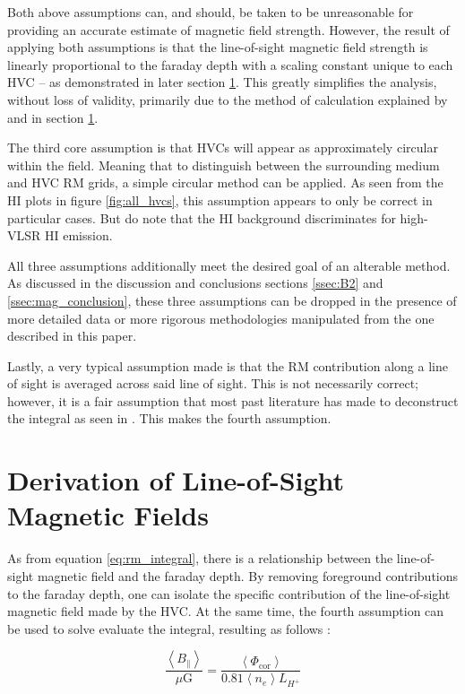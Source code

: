 Both above assumptions can, and should, be taken to be unreasonable for providing an accurate estimate of magnetic field strength. However, the result of applying both assumptions is that the line-of-sight magnetic field strength is linearly proportional to the faraday depth with a scaling constant unique to each HVC – as demonstrated in later section \ref{sec:los_dev}. This greatly simplifies the analysis, without loss of validity, primarily due to the method of calculation explained by \cite{ID27} and in section \ref{sec:los_dev}.


The third core assumption is that HVCs will appear as approximately circular within the field. Meaning that to distinguish between the surrounding medium and HVC RM grids, a simple circular method can be applied. As seen from the HI plots in figure \ref{fig:all_hvcs}, this assumption appears to only be correct in particular cases. But do note that the HI background discriminates for high-VLSR HI emission.


All three assumptions additionally meet the desired goal of an alterable method. As discussed in the discussion and conclusions sections \ref{ssec:B2} and \ref{ssec:mag_conclusion}, these three assumptions can be dropped in the presence of more detailed data or more rigorous methodologies manipulated from the one described in this paper.


Lastly, a very typical assumption made is that the RM contribution along a line of sight is averaged across said line of sight. This is not necessarily correct; however, it is a fair assumption that most past literature has made to deconstruct the integral as seen in \cite{ID27, ID3, ID26}. This makes the fourth assumption.


\section{Derivation of Line-of-Sight Magnetic Fields}
\label{sec:los_dev}

As from equation \ref{eq:rm_integral}, there is a relationship between the line-of-sight magnetic field and the faraday depth. By removing foreground contributions to the faraday depth, one can isolate the specific contribution of the line-of-sight magnetic field made by the HVC. At the same time, the fourth assumption can be used to solve evaluate the integral, resulting as follows \citep{ID26}:


\begin{equation}
    \frac{\left<B_{\parallel}\right>}{\mu\mathrm{G}}=\frac{\left<\Phi_{\mathrm{cor}}\right>}{0.81\left<n_e\right>L_{H^+}}
\label{eq:B_intermediate}
\end{equation}


